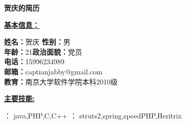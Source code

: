 \documentclass[12pt]{article}
\begin{document}
\begin{center}
  {\large \textbf{贺庆的简历}}
\end{center}

\bigskip
{\large \textbf{\underline{基本信息：}}}\\
\medskip
\begin{flushleft}
  \textbf{姓名：}贺庆 \qquad \quad \textbf{性别：}男\\ 
  \smallskip 
  \textbf{年龄：}21\qquad \qquad \textbf{政治面貌：}党员\\
  \smallskip
  \textbf{电话：}15996234989\\
  \smallskip
  \textbf{邮箱：}captianjabby@gmail.com\\
  \smallskip
  \textbf{教育：}南京大学软件学院本科2010级\\
\end{flushleft}


\bigskip
{\large \textbf{\underline{主要技能:}}}\\
\medskip
\begin{itemize}
：  java,PHP,C,C++
：  struts2,spring,speedPHP,Heritrix
\end{itemize}
\end{document}
